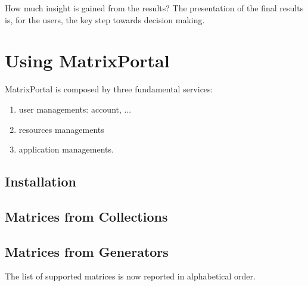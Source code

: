 \documentclass[11pt,relax]{SANDreport}
\begin{document}
How much insight is gained from the results? The presentation of the final
results is, for the users, the key step towards decision making. 

\section{Using MatrixPortal}

MatrixPortal is composed by three fundamental services:
\begin{enumerate}
\item user managements: account, ...
\item resources managements
\item application managements.
\end{enumerate}

\subsection{Installation}

\subsection{Matrices from Collections}

\subsection{Matrices from Generators}

The list of supported matrices is now reported in alphabetical order.
\end{document}
